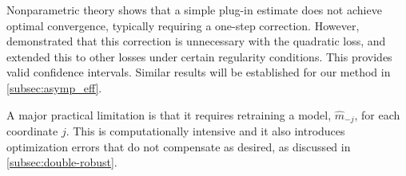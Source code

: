 \documentclass{article}
\theoremstyle{plain}
\theoremstyle{definition}
\theoremstyle{remark}
\begin{document}
Nonparametric theory \citep{kennedy2023semiparametricdoublyrobusttargeted} shows that a simple plug-in estimate does not achieve optimal convergence, typically requiring a one-step correction. However, \citet{williamson2021} demonstrated that this correction is unnecessary with the quadratic loss, and \citet{williamson2023general} extended this to other losses under certain regularity conditions. This provides valid confidence intervals. Similar results will be established for our method in \cref{subsec:asymp_eff}.



A major practical limitation is that it requires retraining a model, $\widehat{m}_{-j}$, for each coordinate $j$. This is computationally intensive and it also introduces optimization errors that do not compensate as desired, as discussed in \cref{subsec:double-robust}.
\end{document}
